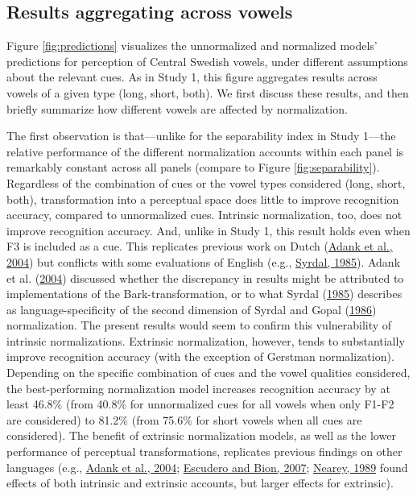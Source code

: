 \documentclass[utf8]{frontiersSCNS}
\begin{document}
\hypertarget{sec:resultsII}{%
\subsection*{Results aggregating across vowels}\label{sec:resultsII}}

Figure \ref{fig:predictions} visualizes the unnormalized and normalized models' predictions for perception of Central Swedish vowels, under different assumptions about the relevant cues. As in Study 1, this figure aggregates results across vowels of a given type (long, short, both). We first discuss these results, and then briefly summarize how different vowels are affected by normalization.

The first observation is that---unlike for the separability index in Study 1---the relative performance of the different normalization accounts within each panel is remarkably constant across all panels (compare to Figure \ref{fig:separability}). Regardless of the combination of cues or the vowel types considered (long, short, both), transformation into a perceptual space does little to improve recognition accuracy, compared to unnormalized cues. Intrinsic normalization, too, does not improve recognition accuracy. And, unlike in Study 1, this result holds even when F3 is included as a cue. This replicates previous work on Dutch (\protect\hyperlink{ref-adank2004}{Adank et al., 2004}) but conflicts with some evaluations of English (e.g., \protect\hyperlink{ref-syrda1985}{Syrdal, 1985}). Adank et al. (\protect\hyperlink{ref-adank2004}{2004}) discussed whether the discrepancy in results might be attributed to implementations of the Bark-transformation, or to what Syrdal (\protect\hyperlink{ref-syrda1985}{1985}) describes as language-specificity of the second dimension of Syrdal and Gopal (\protect\hyperlink{ref-Syrdal1986}{1986}) normalization. The present results would seem to confirm this vulnerability of intrinsic normalizations.
Extrinsic normalization, however, tends to substantially improve recognition accuracy (with the exception of Gerstman normalization). Depending on the specific combination of cues and the vowel qualities considered, the best-performing normalization model increases recognition accuracy by at least 46.8\% (from 40.8\% for unnormalized cues for all vowels when only F1-F2 are considered) to 81.2\% (from 75.6\% for short vowels when all cues are considered). The benefit of extrinsic normalization models, as well as the lower performance of perceptual transformations, replicates previous findings on other languages (e.g., \protect\hyperlink{ref-adank2004}{Adank et al., 2004}; \protect\hyperlink{ref-escudero2007}{Escudero and Bion, 2007}; \protect\hyperlink{ref-nearey1989}{Nearey, 1989} found effects of both intrinsic and extrinsic accounts, but larger effects for extrinsic).
\end{document}
